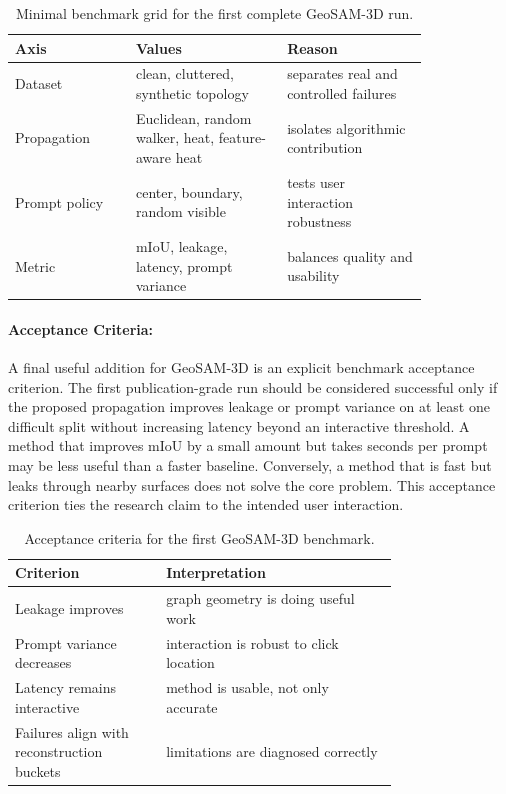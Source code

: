 \documentclass{article}
\begin{document}
\begin{table}[t]
\centering
\caption{Minimal benchmark grid for the first complete GeoSAM-3D run.}
\begin{tabular}{@{}p{0.24\linewidth}p{0.30\linewidth}p{0.28\linewidth}@{}}
\toprule
\textbf{Axis} & \textbf{Values} & \textbf{Reason}\\
\midrule
Dataset & clean, cluttered, synthetic topology & separates real and controlled failures\\
Propagation & Euclidean, random walker, heat, feature-aware heat & isolates algorithmic contribution\\
Prompt policy & center, boundary, random visible & tests user interaction robustness\\
Metric & mIoU, leakage, latency, prompt variance & balances quality and usability\\
\bottomrule
\end{tabular}
\end{table}

\paragraph{Acceptance Criteria:}

A final useful addition for GeoSAM-3D is an explicit benchmark acceptance criterion. The first publication-grade run should be considered successful only if the proposed propagation improves leakage or prompt variance on at least one difficult split without increasing latency beyond an interactive threshold. A method that improves mIoU by a small amount but takes seconds per prompt may be less useful than a faster baseline. Conversely, a method that is fast but leaks through nearby surfaces does not solve the core problem. This acceptance criterion ties the research claim to the intended user interaction.

\begin{table}[t]
\centering
\caption{Acceptance criteria for the first GeoSAM-3D benchmark.}
\begin{tabular}{@{}p{0.30\linewidth}p{0.46\linewidth}@{}}
\toprule
\textbf{Criterion} & \textbf{Interpretation}\\
\midrule
Leakage improves & graph geometry is doing useful work\\
Prompt variance decreases & interaction is robust to click location\\
Latency remains interactive & method is usable, not only accurate\\
Failures align with reconstruction buckets & limitations are diagnosed correctly\\
\bottomrule
\end{tabular}
\end{table}
\end{document}
